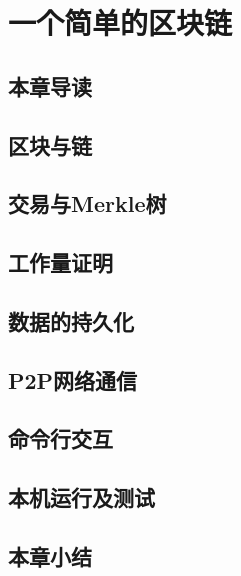 \chapter{一个简单的区块链}%

\section{本章导读}

\section{区块与链}

\section{交易与Merkle树}

\section{工作量证明}

\section{数据的持久化}

\section{P2P网络通信}

\section{命令行交互}

\section{本机运行及测试}

\section{本章小结}

